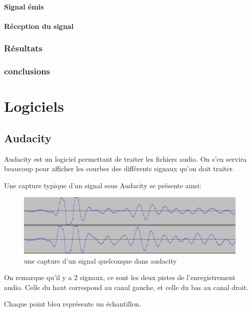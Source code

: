 \subsection{Signal émis}
\subsection{Réception du signal}
\section{Résultats}
\section{conclusions}	
	
\part{Logiciels}
\chapter{Audacity}
Audacity est un logiciel permettant de traiter les fichiers audio.
On s'en servira beaucoup pour afficher les courbes des différents signaux qu'on doit traiter.

Une capture typique d'un signal sous Audacity se présente ainsi:

\begin{figure}[H]
\includegraphics[width=\textwidth]{resources/img/dos_a_dos.png}
\caption{une capture d'un signal quelconque dans audacity}
\end{figure}

On remarque qu'il y a 2 signaux, ce sont les deux pistes de l'enregistrement audio. Celle du haut correspond au canal gauche, et celle du bas au canal droit.

Chaque point bleu représente un échantillon.


%